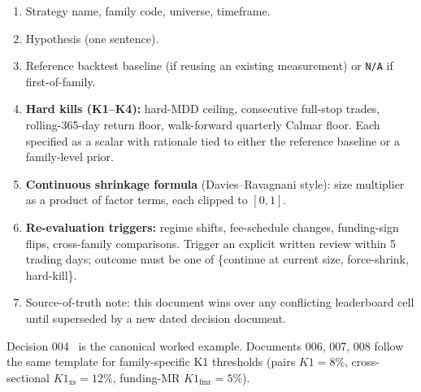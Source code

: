 \documentclass[11pt]{article}
\begin{document}
\begin{enumerate}
  \item Strategy name, family code, universe, timeframe.
  \item Hypothesis (one sentence).
  \item Reference backtest baseline (if reusing an existing measurement) or
        \texttt{N/A} if first-of-family.
  \item \textbf{Hard kills (K1--K4):} hard-MDD ceiling, consecutive
        full-stop trades, rolling-365-day return floor, walk-forward
        quarterly Calmar floor. Each specified as a scalar with rationale
        tied to either the reference baseline or a family-level prior.
  \item \textbf{Continuous shrinkage formula} (Davies--Ravagnani style):
        size multiplier as a product of factor terms, each clipped to
        $[0, 1]$.
  \item \textbf{Re-evaluation triggers:} regime shifts, fee-schedule changes,
        funding-sign flips, cross-family comparisons. Trigger an explicit
        written review within 5 trading days; outcome must be one of
        \{continue at current size, force-shrink, hard-kill\}.
  \item Source-of-truth note: this document wins over any conflicting
        leaderboard cell until superseded by a new dated decision document.
\end{enumerate}

Decision 004~\citep{decision_004} is the canonical worked example. Documents
006, 007, 008 follow the same template for family-specific K1 thresholds
(pairs $K1 = 8\%$, cross-sectional $K1_{\mathrm{xs}} = 12\%$,
funding-MR $K1_{\mathrm{fmr}} = 5\%$).
\end{document}

